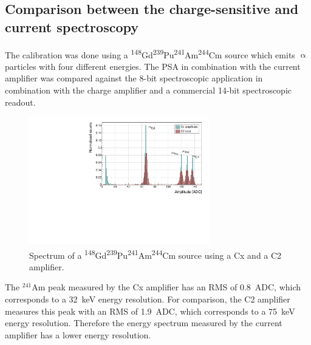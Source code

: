 \subsection{Comparison between the charge-sensitive and current spectroscopy}
The calibration was done using a \textsuperscript{148}Gd\textsuperscript{239}Pu\textsuperscript{241}Am\textsuperscript{244}Cm source which emits $\upalpha$ particles with four different energies. The PSA in combination with the current amplifier was compared against the 8-bit spectroscopic application in combination with the charge amplifier and a commercial 14-bit spectroscopic readout.

\begin{figure}[!t]
\centering
\includegraphics[width=0.7\textwidth]{../scripts/05_current_monitoring/plot4alpha/plots/4alphaCompare}
\caption{Spectrum of a \textsuperscript{148}Gd\textsuperscript{239}Pu\textsuperscript{241}Am\textsuperscript{244}Cm source using a Cx and a C2 amplifier.}
\label{fig:c2cx4alpha}
\end{figure}

The $^{241}$Am peak measured by the Cx amplifier has an RMS of 0.8~ADC, which corresponds to a 32~keV energy resolution. For comparison, the C2 amplifier measures this peak with an RMS of 1.9~ADC, which corresponds to a 75~keV energy resolution. Therefore the energy spectrum measured by the current amplifier has a lower energy resolution.










